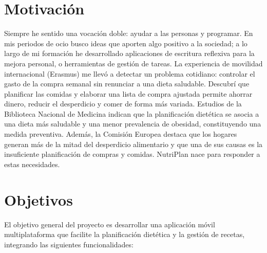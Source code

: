 \documentclass[twoside, openright, 11pt]{report}
\begin{document}
\section{Motivación}
\label{sec.motivacion}
Siempre he sentido una vocación doble: ayudar a las personas y programar. En mis periodos de ocio busco ideas que aporten algo positivo a la sociedad; a lo largo de mi formación he desarrollado aplicaciones de escritura reflexiva para la mejora personal, o herramientas de gestión de tareas. La experiencia de movilidad internacional (Erasmus) me llevó a detectar un problema cotidiano: controlar el gasto de la compra semanal sin renunciar a una dieta saludable. Descubrí que planificar las comidas y elaborar una lista de compra ajustada permite ahorrar dinero, reducir el desperdicio y comer de forma más variada. Estudios de la Biblioteca Nacional de Medicina indican que la planificación dietética se asocia a una dieta más saludable y una menor prevalencia de obesidad, constituyendo una medida preventiva\cite{NLMMealPlanningBenefits}. Además, la Comisión Europea destaca que los hogares generan más de la mitad del desperdicio alimentario y que una de sus causas es la insuficiente planificación de compras y comidas. NutriPlan nace para responder a estas necesidades.

\section{Objetivos}
\label{sec.objetivos}
El objetivo general del proyecto es desarrollar una aplicación móvil multiplataforma que facilite la planificación dietética y la gestión de recetas, integrando las siguientes funcionalidades:
\end{document}
